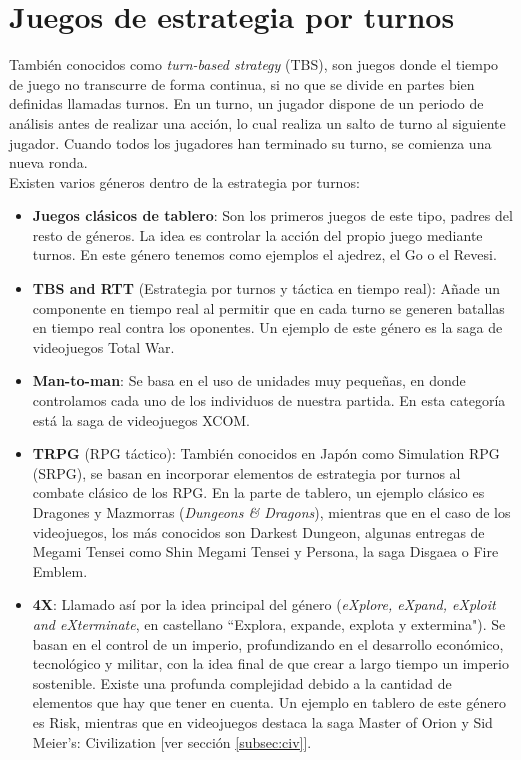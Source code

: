 \section{Juegos de estrategia por turnos}

También conocidos como \textit{turn-based strategy} (TBS), son juegos donde el tiempo de juego no transcurre de forma continua, si no que se divide en partes bien definidas llamadas turnos. En un turno, un jugador dispone de un periodo de análisis antes de realizar una acción, lo cual realiza un salto de turno al siguiente jugador. Cuando todos los jugadores han terminado su turno, se comienza una nueva ronda. \\

Existen varios géneros dentro de la estrategia por turnos:

\begin{itemize}
	\item \textbf{Juegos clásicos de tablero}: Son los primeros juegos de este tipo, padres del resto de géneros. La idea es controlar la acción del propio juego mediante turnos. En este género tenemos como ejemplos el ajedrez, el Go o el Revesi.
	\item \textbf{TBS and RTT} (Estrategia por turnos y táctica en tiempo real): Añade un componente en tiempo real al permitir que en cada turno se generen batallas en tiempo real contra los oponentes. Un ejemplo de este género es la saga de videojuegos Total War.
	\item \textbf{Man-to-man}: Se basa en el uso de unidades muy pequeñas, en donde controlamos cada uno de los individuos de nuestra partida. En esta categoría está la saga de videojuegos XCOM.
	\item \textbf{TRPG} (RPG táctico): También conocidos en Japón como Simulation RPG (SRPG), se basan en incorporar elementos de estrategia por turnos al combate clásico de los RPG. En la parte de tablero, un ejemplo clásico es Dragones y Mazmorras (\textit{Dungeons \& Dragons}), mientras que en el caso de los videojuegos, los más conocidos son Darkest Dungeon, algunas entregas de Megami Tensei como Shin Megami Tensei y Persona, la saga Disgaea o Fire Emblem.
	\item \textbf{4X}: Llamado así por la idea principal del género (\textit{eXplore, eXpand, eXploit and eXterminate}, en castellano ``Explora, expande, explota y extermina"). Se basan en el control de un imperio, profundizando en el desarrollo económico, tecnológico y militar, con la idea final de que crear a largo tiempo un imperio sostenible. Existe una profunda complejidad debido a la cantidad de elementos que hay que tener en cuenta. Un ejemplo en tablero de este género es Risk, mientras que en videojuegos destaca la saga Master of Orion y Sid Meier's: Civilization [ver sección \ref{subsec:civ}].
\end{itemize}

